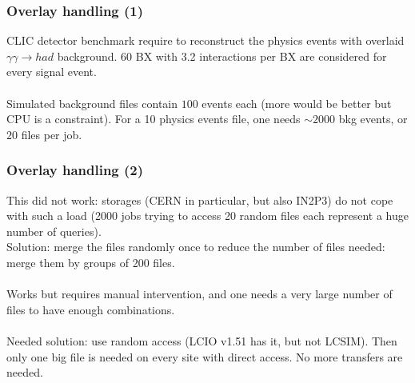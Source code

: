 \documentclass{beamer}
\begin{document}
{
\begin{frame}
\frametitle{Overlay handling (1)}
CLIC detector benchmark require to reconstruct the physics events with overlaid $\gamma\gamma \to had$ background. \alert{60 BX with 3.2 interactions per BX are considered for every signal event}.\\
~\\
Simulated background files contain $100$ events each (more would be better but CPU is a constraint). For a 10 physics events file, one needs $\sim 2000$ bkg events, or \alert{$20$ files per job}.
\end{frame}
\begin{frame}
\frametitle{Overlay handling (2)}
This did not work: storages (CERN in particular, but also IN2P3) do not cope with such a load (2000 jobs trying to access 20 random files each represent a huge number of queries).\\
Solution: \alert{merge the files randomly once} to reduce the number of files needed: merge them by groups of 200 files.\\ 
~\\
Works but requires manual intervention, and one needs a \alert{very large number of files} to have enough combinations.\\
~\\
Needed solution: \alert{use random access} (LCIO v1.51 has it, but not LCSIM). Then only one big file is needed on every site with direct access. No more transfers are needed.
\end{frame}
}
\end{document}
